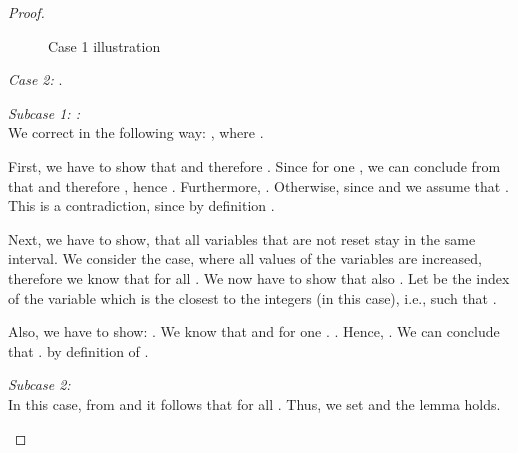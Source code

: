 \documentclass[fleqn,envcountsame]{LMCS}
\newcommand{\ie}{i.e.\xspace}
\begin{document}
\begin{proof}
\begin{figure}[h]
\begin{center}
\end{center}
\caption{Case 1 illustration}
\label{correct1}
\end{figure}


\textit{Case 2:} .

\textit{Subcase 1: :}\\
We correct  in the following way: , where
.

First, we have to show that  and therefore .
Since  for one , 
we can conclude from 
that  and therefore ,
hence .
Furthermore, .
Otherwise, since  and we assume that
. This is a
contradiction, since by definition .

Next, we have to show, that all variables that are not reset stay in the 
same interval. We consider the case, where all values of the variables are
increased, therefore we know that 
for all .
We now have to show that also .
Let  be the index of the variable which is the closest to the integers
(in this case), \ie , such that .


Also, we have to show: .
We know that  and
 for one .
.
Hence, .
We can conclude that .
by definition of .

\textit{Subcase 2: }\\
In this case, from  and 
it follows that  for all .
Thus, we set  and 
the lemma holds.

\begin{figure}[h]
\begin{center}
\end{center}
\end{figure}
\end{proof}
\end{document}
